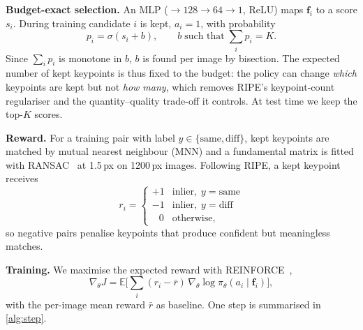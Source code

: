 \documentclass[10pt,twocolumn,letterpaper]{article}
\newcommand{\q}[1]{\noindent\textbf{#1}\hspace{0.4em}}
\begin{document}
\q{Budget-exact selection.} An MLP ($\to128\to64\to1$, ReLU) maps $\mathbf{f}_i$ to a score $s_i$. During
training candidate $i$ is kept, $a_i{=}1$, with probability
\begin{equation}
  p_i = \sigma(s_i + b), \qquad b \;\text{such that}\; \textstyle\sum_{i} p_i = K .
  \label{eq:budget}
\end{equation}
Since $\sum_i p_i$ is monotone in $b$, $b$ is found per image by bisection. The expected number of kept
keypoints is thus fixed to the budget: the policy can change \emph{which} keypoints are kept but not
\emph{how many}, which removes RIPE's keypoint-count regulariser and the quantity--quality trade-off it controls.
At test time we keep the top-$K$ scores.

\q{Reward.} For a training pair with label $y\in\{\text{same},\text{diff}\}$, kept keypoints are matched by
mutual nearest neighbour (MNN) and a fundamental matrix is fitted with RANSAC~\cite{larsson2020poselib} at
1.5\,px on 1200\,px images. Following RIPE, a kept keypoint receives
\begin{equation}
  r_i = \begin{cases} +1 & \text{inlier},\; y=\text{same} \\ -1 & \text{inlier},\; y=\text{diff} \\
  \;\;\,0 & \text{otherwise}, \end{cases}
  \label{eq:reward}
\end{equation}
so negative pairs penalise keypoints that produce confident but meaningless matches.

\q{Training.} We maximise the expected reward with REINFORCE~\cite{williams1992reinforce},
\begin{equation}
  \nabla_\theta J = \mathbb{E}\Big[\textstyle\sum_i (r_i - \bar r)\,\nabla_\theta \log
  \pi_\theta(a_i \mid \mathbf{f}_i)\Big],
  \label{eq:reinforce}
\end{equation}
with the per-image mean reward $\bar r$ as baseline. One step is summarised in \cref{alg:step}.
\end{document}

